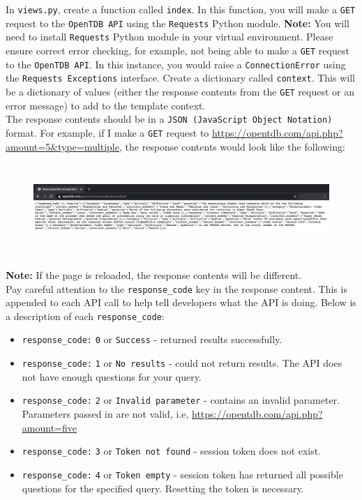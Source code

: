 \documentclass{article}
\begin{document}
In \texttt{views.py}, create a function called \texttt{index}. In this function, you will make a \texttt{GET} request to the \texttt{OpenTDB API} using the \texttt{Requests} Python module. \textbf{Note:} You will need to install \texttt{Requests} Python module in your virtual environment. Please ensure correct error checking, for example, not being able to make a \texttt{GET} request to the \texttt{OpenTDB API}. In this instance, you would raise a \texttt{ConnectionError} using the \texttt{Requests Exceptions} interface. Create a dictionary called \texttt{context}. This will be a dictionary of values (either the response contents from the \texttt{GET} request or an error message) to add to the template context. \\ 

The response contents should be in a \texttt{JSON (JavaScript Object Notation)} format. For example, if I make a \texttt{GET} request to \href{https://opentdb.com/api.php?amount=5\&type=multiple}{https://opentdb.com/api.php?amount=5\&type=multiple}, the response contents would look like the following: \\

\begin{figure}[H]
	\includegraphics[width=175mm, height=35mm]{./img/08-quiz-json.png}
\end{figure}

\textbf{Note:} If the page is reloaded, the response contents will be different. \\

Pay careful attention to the \texttt{response\_code} key in the response content. This is appended to each API call to help tell developers what the API is doing. Below is a description of each \texttt{response\_code}:
\begin{itemize}
  \item \texttt{response\_code:} \texttt{0} or \texttt{Success} - returned results successfully.
  \item \texttt{response\_code:} \texttt{1} or \texttt{No results} - could not return results. The API does not have enough questions for your query.
  \item \texttt{response\_code:} \texttt{2} or \texttt{Invalid parameter} - contains an invalid parameter. Parameters passed in are not valid, i.e, \href{https://opentdb.com/api.php?amount=five}{https://opentdb.com/api.php?amount=five} 
  \item \texttt{response\_code:} \texttt{3} or \texttt{Token not found} - session token does not exist.
  \item \texttt{response\_code:} \texttt{4} or \texttt{Token empty} - session token has returned all possible questions for the specified query. Resetting the token is necessary.
\end{itemize}
\end{document}
